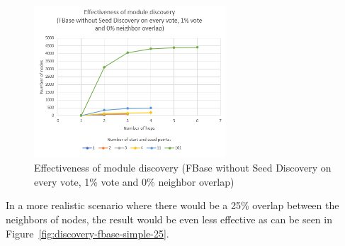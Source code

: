 \begin{figure}[ht!]
	\centering
	\includegraphics[width=0.64\textwidth]{images/evaluation-discovery-fbase-simple-0.png}
	\caption{\label{fig:discovery-fbase-simple-0} Effectiveness of module discovery (FBase without Seed Discovery on every vote, 1\% vote and 0\% neighbor overlap)}
\end{figure}


In a more realistic scenario where there would be a 25\% overlap between the neighbors of nodes, the result would be even less effective as can be seen in Figure~\ref{fig:discovery-fbase-simple-25}.

